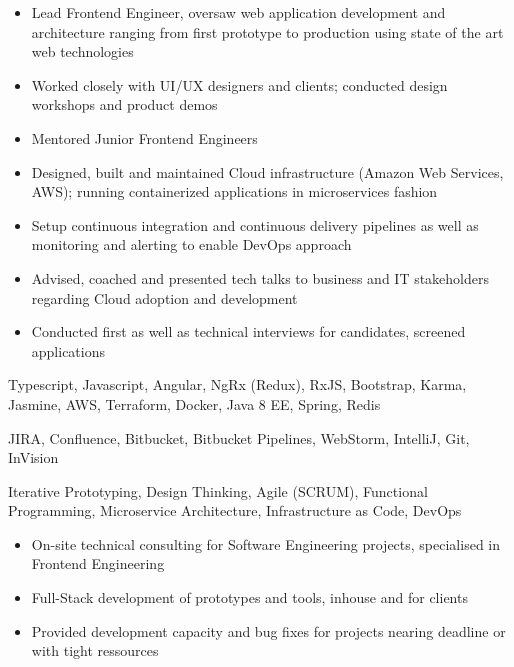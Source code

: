 
\begin{itemize}
	\item Lead Frontend Engineer, oversaw web application development and architecture ranging from first prototype to production using state of the art web technologies
	\item Worked closely with UI/UX designers and clients; conducted design workshops and product demos
	\item Mentored Junior Frontend Engineers
	\item Designed, built and maintained Cloud infrastructure (Amazon Web Services, AWS); running containerized applications in microservices fashion
	\item Setup continuous integration and continuous delivery pipelines as well as monitoring and alerting to enable DevOps approach
	\item Advised, coached and presented tech talks to business and IT stakeholders regarding Cloud adoption and development
	\item Conducted first as well as technical interviews for candidates, screened applications
\end{itemize}

\medskip
\begin{description}
	\ifincludestech
	\item [Technologies:] Typescript, Javascript, Angular, NgRx (Redux), RxJS, Bootstrap, Karma, Jasmine, AWS, Terraform, Docker, Java 8 EE, Spring, Redis
	\fi
	\ifincludestools
	\item [Tools:] JIRA, Confluence, Bitbucket, Bitbucket Pipelines, WebStorm, IntelliJ, Git, InVision
	\fi
	\ifincludesmethods
	\item [Methodologies:] Iterative Prototyping, Design Thinking, Agile (SCRUM), Functional Programming, Microservice Architecture, Infrastructure as Code, DevOps
	\fi
\end{description}

\divider


\begin{itemize}
	\item On-site technical consulting for Software Engineering projects, specialised in Frontend Engineering
	\item Full-Stack development of prototypes and tools, inhouse and for clients
	\item Provided development capacity and bug fixes for projects nearing deadline or with tight ressources
\end{itemize}

